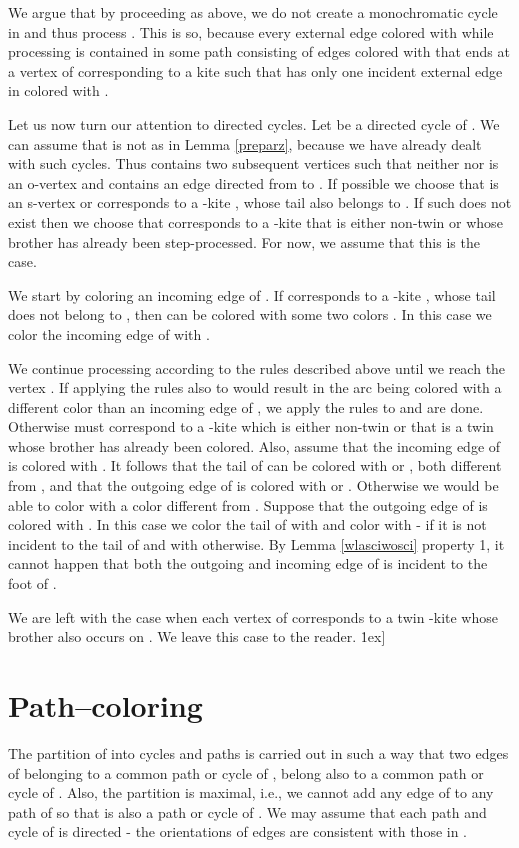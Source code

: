 \documentclass[a4, 11pt]{article}
\newcommand{\koniec}{\hfill \.1ex]}
\newcommand{\<}{\langle}
\renewcommand{\>}{\rangle}
\begin{document}
We argue that by proceeding as above, we do not create a monochromatic cycle in  and thus process . This is so, because every external edge colored with  while processing  is contained in some  path  consisting of edges colored with  that ends at a vertex of  corresponding to a kite  such that  has only one incident external edge in  colored with .


Let us now turn our attention to directed cycles. Let  be a  directed cycle of . We can assume that  is not as in Lemma \ref{preparz}, because we have already dealt with such cycles. Thus  contains two subsequent vertices   such that neither  nor  is an o-vertex and  contains an edge  directed from  to . If possible we choose  that is an s-vertex or corresponds to a -kite , whose tail also belongs to . If such  does not exist then we choose  that corresponds to a -kite that is either non-twin or whose brother has already been step-processed. For now, we assume that this is the case.

 We start by coloring an incoming edge of . If  corresponds to a -kite , whose tail  does not belong to , then  can be colored with some two colors . In this case we color the incoming edge of  with .


We continue processing  according to the rules described above until we reach the vertex . If applying the rules also to  would result in the arc  being colored with a different color than an incoming edge of , we apply the rules to  and are done. Otherwise  must correspond to a -kite  which is either non-twin or that is a twin whose brother has already been colored. Also, assume  that the incoming edge of  is colored with . It follows  that the tail of  can be colored with  or , both different from , and that the outgoing edge of  is colored with  or . Otherwise we would be able to color  with a color different from . Suppose that the outgoing edge of  is colored with . In this case we color the tail of  with  and color  with  - if it is not incident to the tail of  and with  otherwise. By Lemma \ref{wlasciwosci} property 1, it cannot happen that both the outgoing and incoming edge of  is incident to the foot of .

We are left with the case when each vertex of  corresponds to a twin -kite whose brother also occurs on . We leave this case to the reader. \koniec


\section{Path--coloring} \label{path2}
The partition of  into cycles and paths is carried out in such a way that two edges of  belonging to a common path or cycle of , belong also to a common path or cycle of . Also, the partition is maximal, i.e., we cannot
add any edge  of  to any path  of  so that  is also a path or cycle of . We may assume that each path and cycle of  is directed - the orientations of edges are consistent with those in . 
\end{document}
